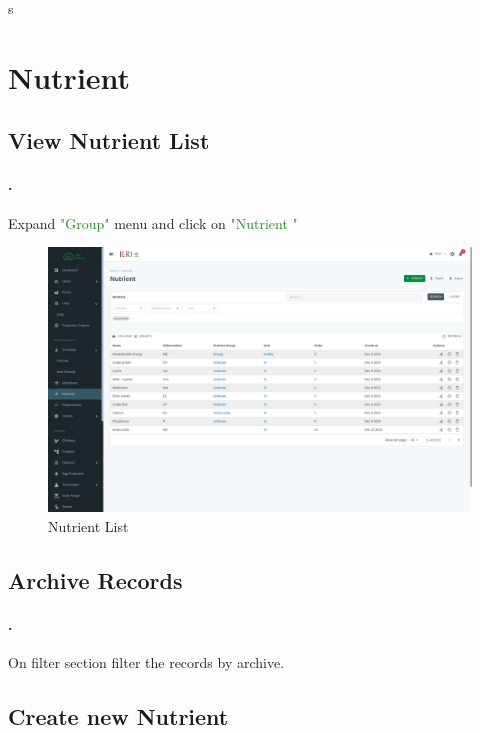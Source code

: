 s\section{Nutrient}\label{sec:nutrient}

\subsection{View Nutrient  List}\label{sec:nutrient_list}
\setcounter{stepcounter}{1}
\paragraph{.}Expand \textcolor{ForestGreen}{"Group"} menu and click on \textcolor{ForestGreen}{"Nutrient "}
\begin{figure}[h!]
  	\includegraphics[width=15cm]{screenshots/nutrient_list_page.png}
  	\caption{Nutrient  List}
  	\label{fig:nutrient_list_page}
\end{figure}

\subsection{Archive Records}\label{sec:nutrient_list_archived}
\setcounter{stepcounter}{1}
\paragraph{.}On filter section filter the records by archive.

\subsection{Create new Nutrient }\label{sec:nutrient_create}
\setcounter{stepcounter}{1}
